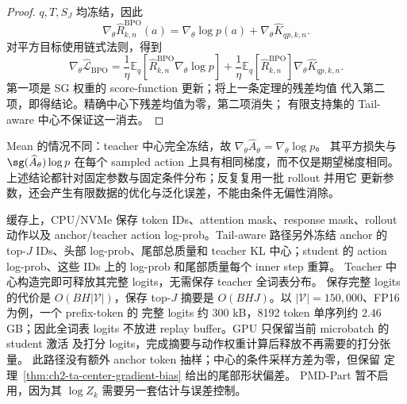 \begin{proof}
$q,T,S_J$ 均冻结，因此
\begin{equation}
 \nabla_\theta\widehat R_{k,n}^{\mathrm{BPO}}(a)
 =\nabla_\theta\log p(a)+\nabla_\theta\widehat K_{qp,k,n}.
\end{equation}
对平方目标使用链式法则，得到
\begin{equation}
 \nabla_\theta\widehat{\mathcal L}_{\mathrm{BPO}}
 =\frac1\eta\mathbb E_q[\widehat R_{k,n}^{\mathrm{BPO}}\nabla_\theta\log p]
 +\frac1\eta\mathbb E_q[\widehat R_{k,n}^{\mathrm{BPO}}]
   \nabla_\theta\widehat K_{qp,k,n}.
\end{equation}
第一项是 SG 权重的 score-function 更新；将上一条定理的残差均值 代入第二项，即得结论。精确中心下残差均值为零，第二项消失； 有限支持集的 Tail-aware 中心不保证这一消去。
\end{proof}

Mean 的情况不同：teacher 中心完全冻结，故 $\nabla_\theta\widehat A_\theta=\nabla_\theta\log p$。 其平方损失与 $\sg(\widehat A_\theta)\log p$ 在每个 sampled action 上具有相同梯度，而不仅是期望梯度相同。 上述结论都针对固定参数与固定条件分布；反复复用一批 rollout 并用它 更新参数，还会产生有限数据的优化与泛化误差，不能由条件无偏性消除。

缓存上，CPU/NVMe 保存 token IDs、attention mask、response mask、rollout 动作以及 anchor/teacher action log-prob。Tail-aware 路径另外冻结 anchor 的 top-$J$ IDs、头部 log-prob、尾部总质量和 teacher KL 中心；student 的 action log-prob、这些 IDs 上的 log-prob 和尾部质量每个 inner step 重算。 Teacher 中心构造完即可释放其完整 logits，无需保存 teacher 全词表分布。 保存完整 logits 的代价是 $O(BH|\mathcal V|)$，保存 top-$J$ 摘要是 $O(BHJ)$。以 $|\mathcal V|=150{,}000$、FP16 为例，一个 prefix-token 的 完整 logits 约 $300$ kB，8192 token 单序列约 $2.46$ GB；因此全词表 logits 不放进 replay buffer。GPU 只保留当前 microbatch 的 student 激活 及打分 logits，完成摘要与动作权重计算后释放不再需要的打分张量。 此路径没有额外 anchor token 抽样；中心的条件采样方差为零，但保留 定理~\ref{thm:ch2-ta-center-gradient-bias} 给出的尾部形状偏差。 PMD-Part 暂不启用，因为其 $\log Z_k$ 需要另一套估计与误差控制。

